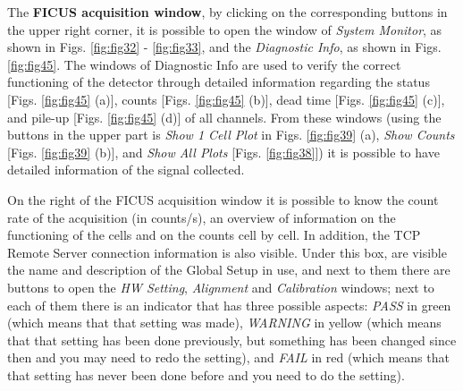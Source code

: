 \documentclass[a4paper,12pt,oneside,pdflatex,italian,final,twocolumn]{article}
\begin{document}
The \textbf{FICUS acquisition window}, by clicking on the corresponding buttons in the upper right corner, it is possible to open the window of \textit{System Monitor}, as shown in Figs. \ref{fig:fig32} - \ref{fig:fig33}, and the \textit{Diagnostic Info}, as shown in Figs. \ref{fig:fig45}. The windows of Diagnostic Info are used to verify the correct functioning of the detector through detailed information regarding the status [Figs. \ref{fig:fig45} (a)], counts [Figs. \ref{fig:fig45} (b)], dead time [Figs. \ref{fig:fig45} (c)], and pile-up [Figs. \ref{fig:fig45} (d)] of all channels. From these windows (using the buttons in the upper part is \textit{Show 1 Cell Plot} in Figs. \ref{fig:fig39} (a), \textit{Show Counts} [Figs. \ref{fig:fig39} (b)], and \textit{Show All Plots} [Figs. \ref{fig:fig38}]) it is possible to have detailed information of the signal collected.

On the right of the FICUS acquisition window it is possible to know the count rate of the acquisition (in counts/s), an overview of information on the functioning of the cells and on the counts cell by cell. In addition, the TCP Remote Server connection information is also visible. Under this box, are visible the name and description of the Global Setup in use, and next to them there are buttons to open the \textit{HW Setting}, \textit{Alignment} and \textit{Calibration} windows; next to each of them there is an indicator that has three possible aspects: \textit{PASS} in green (which means that that setting was made), \textit{WARNING} in yellow (which means that that setting has been done previously, but something has been changed since then and you may need to redo the setting), and \textit{FAIL} in red (which means that that setting has never been done before and you need to do the setting).

\clearpage
\end{document}
